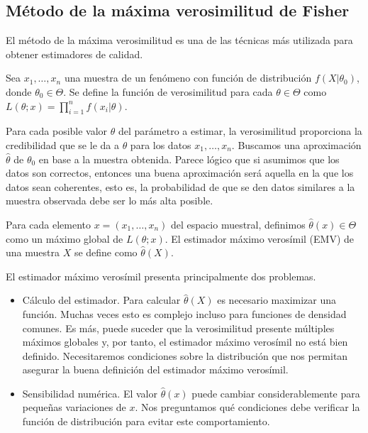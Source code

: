 \subsection{Método de la máxima verosimilitud de Fisher}

    El método de la máxima verosimilitud es una de las técnicas más utilizada para obtener estimadores de calidad.

    \begin{definition}
        Sea $x_1, \ldots, x_n$ una muestra de un fenómeno con función de distribución $f(X | \theta_0)$, donde $\theta_0 \in \Theta$. Se define la función de verosimilitud para cada $\theta \in \Theta$ como $L(\theta ; x) = \prod_{i = 1}^n f(x_i| \theta)$.
    \end{definition}

    Para cada posible valor $\theta$ del parámetro a estimar, la verosimilitud proporciona la credibilidad que se le da a $\theta$ para los datos $x_1, \ldots, x_n$. Buscamos una aproximación $\hat{\theta}$ de $\theta_0$ en base a la muestra obtenida. Parece lógico que si asumimos que los datos son correctos, entonces una buena aproximación será aquella en la que los datos sean coherentes, esto es, la probabilidad de que se den datos similares a la muestra observada debe ser lo más alta posible.

    \begin{definition}
        Para cada elemento $x = (x_1, \ldots, x_n)$ del espacio muestral, definimos $\hat{\theta}(x) \in \Theta$ como un máximo global de $L(\theta ; x)$. El estimador máximo verosímil (EMV) de una muestra $X$ se define como $\hat{\theta}(X)$.
    \end{definition}

    El estimador máximo verosímil presenta principalmente dos problemas.
    \begin{itemize}
        \item Cálculo del estimador. Para calcular $\hat{\theta}(X)$ es necesario maximizar una función. Muchas veces esto es complejo incluso para funciones de densidad comunes. Es más, puede suceder que la verosimilitud presente múltiples máximos globales y, por tanto, el estimador máximo verosímil no está bien definido. Necesitaremos condiciones sobre la distribución que nos permitan asegurar la buena definición del estimador máximo verosímil.
        \item Sensibilidad numérica. El valor $\hat{\theta}(x)$ puede cambiar considerablemente para pequeñas variaciones de $x$. Nos preguntamos qué condiciones debe verificar la función de distribución para evitar este comportamiento.
    \end{itemize}

